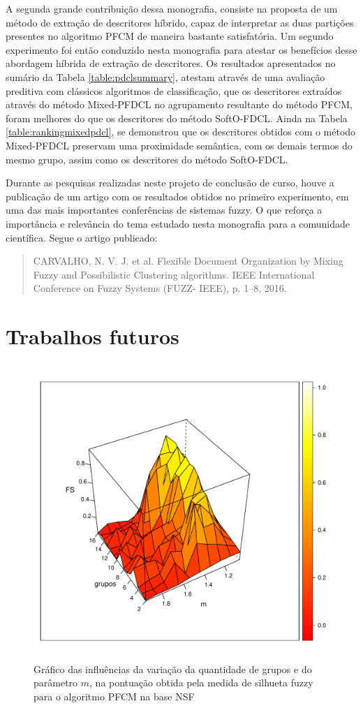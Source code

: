 A segunda grande contribuição dessa monografia, consiste na proposta de um método de extração de
descritores híbrido, capaz de interpretar as duas partições presentes no algoritmo PFCM de maneira
bastante satisfatória. Um segundo experimento foi então conduzido nesta monografia para atestar os
benefícios desse abordagem híbrida de extração de descritores. Os resultados apresentados no sumário
da Tabela \ref{table:pdclsummary}, atestam através de uma avaliação preditiva com clássicos
algoritmos de classificação, que os descritores extraídos através do método Mixed-PFDCL no
agrupamento resultante do método PFCM, foram melhores do que os descritores do método SoftO-FDCL.
Ainda na Tabela \ref{table:rankingmixedpdcl}, se demonstrou que os descritores obtidos com o método
Mixed-PFDCL preservam uma proximidade semântica, com os demais termos do mesmo grupo, assim como os
descritores do método SoftO-FDCL.

Durante as pesquisas realizadas neste projeto de conclusão de curso, houve a publicação de um artigo
com os resultados obtidos no primeiro experimento, em uma das mais importantes conferências de
sistemas fuzzy. O que reforça a importância e relevância do tema estudado nesta monografia para a
comunidade científica. Segue o artigo publicado:
\begin{quote}
CARVALHO, N. V. J. et al. Flexible Document Organization by Mixing Fuzzy and Possibilistic
Clustering algorithms. IEEE International Conference on Fuzzy Systems (FUZZ- IEEE), p. 1–8, 2016.
\end{quote}

\section{Trabalhos futuros}

\begin{figure}[!htp] \centering 
  \centering
  \includegraphics[width=0.8\columnwidth]{assets/future_works/pfcm_nsf_varying.pdf} 
  \caption{Gráfico das influências da variação da quantidade de grupos e do parâmetro $m$, na
pontuação obtida pela medida de silhueta fuzzy para o algoritmo PFCM na base NSF} 
  \label{fig:pfcmvarying}
\end{figure}

